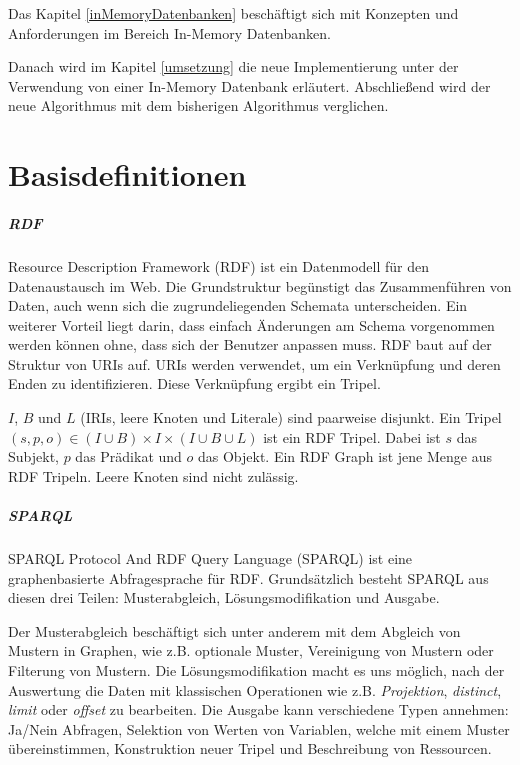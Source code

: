 \documentclass[draft,final]{vutinfth} %
\begin{document}
Das Kapitel \ref{inMemoryDatenbanken} beschäftigt sich mit Konzepten und Anforderungen im Bereich In-Memory Datenbanken. 

Danach wird im Kapitel \ref{umsetzung} die neue Implementierung unter der Verwendung von einer In-Memory Datenbank erläutert. Abschlie{\ss}end wird der neue Algorithmus mit dem bisherigen Algorithmus verglichen.

\chapter{Basisdefinitionen} \label{basisdef}
\paragraph{RDF}
Resource Description Framework (RDF) ist ein Datenmodell für den Datenaustausch im Web. Die Grundstruktur begünstigt das Zusammenführen von Daten, auch wenn sich die zugrundeliegenden Schemata unterscheiden. Ein weiterer Vorteil liegt darin, dass einfach Änderungen am Schema vorgenommen werden können ohne, dass sich der Benutzer anpassen muss. RDF baut auf der Struktur von URIs auf. URIs werden verwendet, um ein Verknüpfung und deren Enden zu identifizieren. Diese Verknüpfung ergibt ein Tripel.

$I$, $B$ und $L$ (IRIs, leere Knoten und Literale) sind paarweise disjunkt.
 Ein Tripel $(s,p,o) \in (I \cup B) \times I \times (I \cup B \cup L)$ ist ein RDF Tripel. Dabei ist $s$ das Subjekt, $p$ das Prädikat und $o$ das Objekt. Ein RDF Graph ist jene Menge aus RDF Tripeln. Leere Knoten sind nicht zulässig. \\ \cite{rdfSite, PAG09}  

\paragraph{SPARQL}
SPARQL Protocol And RDF Query Language (SPARQL) ist eine graphenbasierte Abfragesprache für RDF. Grundsätzlich besteht SPARQL aus diesen drei Teilen: Musterabgleich, Lösungsmodifikation und Ausgabe.

Der Musterabgleich beschäftigt sich unter anderem mit dem Abgleich von Mustern in Graphen, wie z.B. optionale Muster, Vereinigung von Mustern oder Filterung von Mustern. Die Lösungsmodifikation macht es uns möglich, nach der Auswertung die Daten mit klassischen Operationen wie z.B. \textit{Projektion}, \textit{distinct}, \textit{limit} oder \textit{offset} zu bearbeiten. Die Ausgabe kann verschiedene Typen annehmen: Ja/Nein Abfragen, Selektion von Werten von Variablen, welche mit einem Muster übereinstimmen, Konstruktion neuer Tripel und Beschreibung von Ressourcen.
\end{document}

